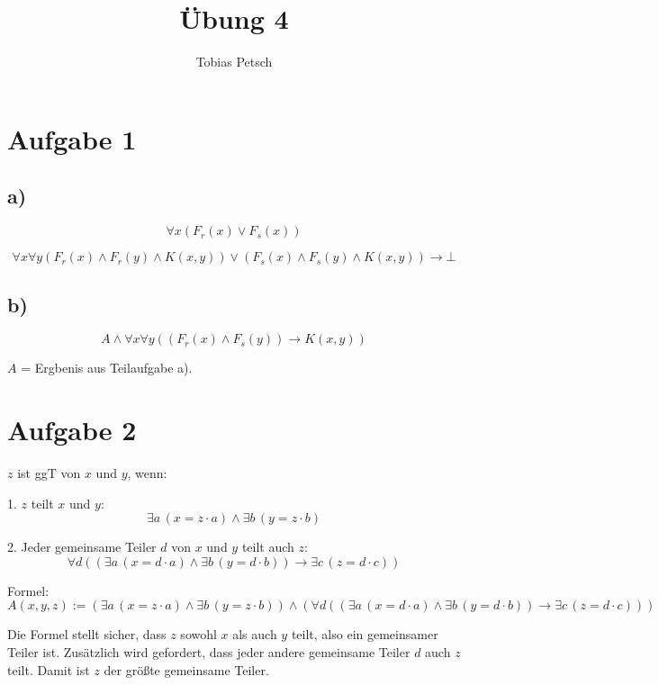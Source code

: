 \documentclass[a4paper,12pt]{article}
\title{Übung 4}
\author{Tobias Petsch}
\date{}
\begin{document}
\maketitle

\section*{Aufgabe 1}
\subsection*{a)}

\[
\forall x (F_r(x) \lor F_s(x))
\]

\[
\forall x \forall y (F_r(x) \land F_r(y) \land K(x,y)) \lor (F_s(x) \land F_s(y) \land K(x,y)) \rightarrow \bot 
\]

\subsection*{b)}
\[
A \land \forall x \forall y \left( (F_r(x) \land F_s(y)) \rightarrow K(x, y) \right)
\]

$A$ = Ergbenis aus Teilaufgabe a).



\section*{Aufgabe 2}



$z$ ist ggT von $x$ und $y$, wenn:

1. $z$ teilt $x$ und $y$:  
\[
\exists a\, (x = z \cdot a) \land \exists b\, (y = z \cdot b)
\]

2. Jeder gemeinsame Teiler $d$ von $x$ und $y$ teilt auch $z$:  
\[
\forall d \left( (\exists a\, (x = d \cdot a) \land \exists b\, (y = d \cdot b)) \rightarrow \exists c\, (z = d \cdot c) \right)
\]

Formel:
\[
A(x, y, z) := 
\left( \exists a\, (x = z \cdot a) \land \exists b\, (y = z \cdot b) \right) 
\land 
\left( \forall d \left( (\exists a\, (x = d \cdot a) \land \exists b\, (y = d \cdot b)) \rightarrow \exists c\, (z = d \cdot c) \right) \right)
\]


Die Formel stellt sicher, dass $z$ sowohl $x$ als auch $y$ teilt, also ein gemeinsamer Teiler ist. 
Zusätzlich wird gefordert, dass jeder andere gemeinsame Teiler $d$ auch $z$ teilt. 
Damit ist $z$ der größte gemeinsame Teiler.
\end{document}

